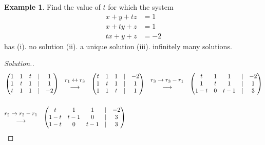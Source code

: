 \documentclass[11pt,a4paper]{article}
\theoremstyle{definition}
\newtheorem{exa}[thm]{Example}
\newenvironment{solution}
  {\renewcommand{\qedsymbol}{}\begin{proof}[\textit{Solution}.]}
  {\end{proof}}
\begin{document}
\begin{exa}
Find the value of $t$ for which the system
\begin{align*}
x+y+tz&=1\\x+ty+z&=1\\tx+y+z&=-2
\end{align*}
has (i). no solution  (ii). a unique solution (iii). infinitely many solutions.
\end{exa}


\begin{solution}
\begin{align*}
&
\begin{pmatrix}
1&1&t&|&1\\1&t&1&|&1\\t&1&1&|&-2\\
\end{pmatrix}
\hspace{0.3cm}
\begin{matrix}
r_1\leftrightarrow r_3\\ \longrightarrow\\
\end{matrix}
\hspace{0.3cm}
\begin{pmatrix}
t&1&1&|&-2\\1&t&1&|&1\\1&1&t&|&1\\
\end{pmatrix}
\hspace{0.3cm}
\begin{matrix}
r_3\rightarrow r_3-r_1\\ \longrightarrow\\
\end{matrix}
\hspace{0.3cm}
\begin{pmatrix}
t&1&1&|&-2\\1&t&1&|&1\\1-t&0&t-1&|&3\\
\end{pmatrix}\\\\
&
\begin{matrix}
r_2\rightarrow r_2-r_1\\ \longrightarrow\\
\end{matrix}
\hspace{0.3cm}
\begin{pmatrix}
t&1&1&|&-2\\1-t&t-1&0&|&3\\1-t&0&t-1&|&3\\

\end{pmatrix}
\end{align*}
\end{solution}
\end{document}
